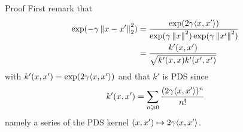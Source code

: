 \documentclass[xcolor={usenames,dvipsnames}]{beamer}
\begin{document}
\begin{frame}{Proof}
 First remark that
  \begin{align*}
    \exp(-\gamma \left\| x - x' \right\|_2^2) &= \frac{\exp(2 \gamma \langle x,x' \rangle)}{\exp(\gamma \left\| x \right\|^2) \exp(\gamma \left\| x' \right\|^2)} \\
    &= \frac{k'(x, x')}{\sqrt{k'(x, x) k'(x', x')}}
  \end{align*}
  with $k'(x, x') = \exp(2 \gamma \langle x, x' \rangle)$ and that $k'$ is PDS since
  \begin{equation*}
    k'(x, x') = \sum_{n \geqslant 0} \frac{(2 \gamma \langle x, x' \rangle)^n}{n!}
  \end{equation*}
  namely a series of the PDS kernel $(x, x') \mapsto 2 \gamma \langle x, x' \rangle$.
 \end{frame}
% 
% 
% 
\end{document}

